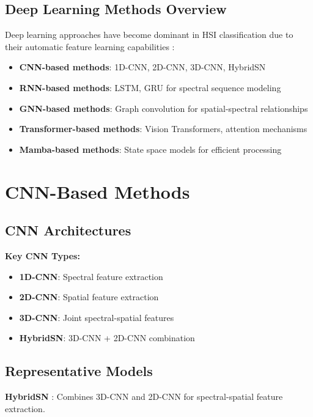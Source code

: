 \documentclass[12pt,a4paper]{article}
\begin{document}
\subsection{Deep Learning Methods Overview}

Deep learning approaches have become dominant in HSI classification due to their automatic feature learning capabilities \cite{li2017deep}:

\begin{itemize}
\item \textbf{CNN-based methods}: 1D-CNN, 2D-CNN, 3D-CNN, HybridSN
\item \textbf{RNN-based methods}: LSTM, GRU for spectral sequence modeling
\item \textbf{GNN-based methods}: Graph convolution for spatial-spectral relationships
\item \textbf{Transformer-based methods}: Vision Transformers, attention mechanisms
\item \textbf{Mamba-based methods}: State space models for efficient processing
\end{itemize}





\section{CNN-Based Methods}

\subsection{CNN Architectures}

\textbf{Key CNN Types:}
\begin{itemize}
\item \textbf{1D-CNN}: Spectral feature extraction \cite{li2017deep}
\item \textbf{2D-CNN}: Spatial feature extraction \cite{li2017deep}
\item \textbf{3D-CNN}: Joint spectral-spatial features \cite{paoletti2019deep}
\item \textbf{HybridSN}: 3D-CNN + 2D-CNN combination \cite{roy2019hybridSN}
\end{itemize}

\subsection{Representative Models}

\textbf{HybridSN} \cite{roy2019hybridSN}: Combines 3D-CNN and 2D-CNN for spectral-spatial feature extraction.
\end{document}
